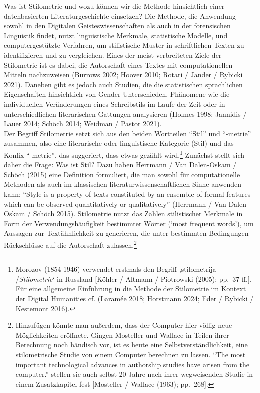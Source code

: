 \documentclass[
  12pt,
  letterpaper,
]{classicthesis}
\begin{document}
Was ist Stilometrie und wozu können wir die Methode hinsichtlich einer
datenbasierten Literaturgeschichte einsetzen? Die Methode, die Anwendung
sowohl in den Digitalen Geisteswissenschaften als auch in der
forensischen Linguistik findet, nutzt linguistische Merkmale,
statistische Modelle, und computergestützte Verfahren, um stilistische
Muster in schriftlichen Texten zu identifizieren und zu vergleichen.
Eines der meist verbreiteten Ziele der Stilometrie ist es dabei, die
Autorschaft eines Textes mit computationellen Mitteln nachzuweisen
(Burrows 2002; Hoover 2010; Rotari / Jander / Rybicki 2021). Daneben
gibt es jedoch auch Studien, die die statistischen sprachlichen
Eigenschaften hinsichtlich von Gender-Unterschieden, Phänomene wie die
individuellen Veränderungen eines Schreibstils im Laufe der Zeit oder in
unterschiedlichen literarischen Gattungen analysieren (Holmes 1998;
Jannidis / Lauer 2014; Schöch 2014; Weidman / Pastor 2021).\\
Der Begriff Stilometrie setzt sich aus den beiden Wortteilen ``Stil''
und ``-metrie'' zusammen, also eine literarische oder linguistische
Kategorie (Stil) und das Konfix ``-metrie'', das suggeriert, dass etwas
gezählt wird.\footnote{Morozov (1854-1946) verwendet erstmals den
  Begriff ‚stilometrija /\emph{Stilometrie}` in Russland {[}Köhler /
  Altmann / Piotrowski (2005); pp.~37 ff.{]}. Für eine allgemeine
  Einführung in die Methode der Stilometrie im Kontext der Digital
  Humanities cf. (Laramée 2018; Horstmann 2024; Eder / Rybicki /
  Kestemont 2016).} Zunächst stellt sich daher die Frage: Was ist Stil?
Dazu haben Herrmann / Van Dalen-Oskam / Schöch (2015) eine Definition
formuliert, die man sowohl für computationelle Methoden als auch im
klassischen literaturwissenschaftlichen Sinne anwenden kann: ``Style is
a property of texts constituted by an ensemble of formal features which
can be observed quantitatively or qualitatively'' (Herrmann / Van
Dalen-Oskam / Schöch 2015). Stilometrie nutzt das Zählen stilistischer
Merkmale in Form der Verwendungshäufigkeit bestimmter Wörter (`most
frequent words'), um Aussagen zur Textähnlichkeit zu generieren, die
unter bestimmten Bedingungen Rückschlüsse auf die Autorschaft
zulassen.\footnote{Hinzufügen könnte man außerdem, dass der Computer
  hier völlig neue Möglichkeiten eröffnete. Gingen Mosteller und Wallace
  in Teilen ihrer Berechnung noch händisch vor, ist es heute eine
  Selbstverständlichkeit, eine stilometrische Studie von einem Computer
  berechnen zu lassen. ``The most important technological advances in
  authorship studies have arisen from the computer.'' stellen sie auch
  selbst 20 Jahre nach ihrer wegweisenden Studie in einem Zusatzkapitel
  fest {[}Mosteller / Wallace (1963); pp.~268{]}.}
\end{document}
